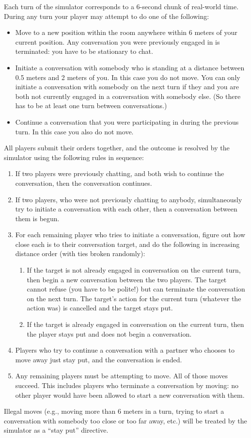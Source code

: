 Each turn of the simulator corresponds to a 6-second chunk of
real-world time. During any turn your player may attempt to do one of the following:
\begin{itemize}
\item Move to a new position within the room anywhere within 6 meters of your current position. Any conversation
you were previously engaged in is terminated: you have to be stationary to chat.
\item Initiate a conversation with somebody who is standing at a distance between 0.5
meters and 2 meters of you. In this case you do not move.
You can only initiate a conversation with somebody on the next turn
if they and you are both not currently engaged in a conversation with
somebody else. (So there has to be at least one turn between conversations.)
\item Continue a conversation that you were participating in during the previous turn. In this case you also do not move.
\end{itemize}

All players submit their orders together, and the outcome is resolved by the simulator using the following rules in sequence:
\begin{enumerate}
\item If two players were previously chatting, and both wish to continue the conversation, then
the conversation continues.
\item If two players, who were not previously chatting to anybody, simultaneously try to initiate a conversation
with each other, then a conversation between them is begun.
\item For each remaining player who tries to initiate a conversation, figure out how close each is to
their conversation target, and do the following in increasing distance order (with ties broken randomly):
\begin{enumerate}
\item If the target is not already engaged in conversation on the current turn, then begin a new conversation
between the two players.  The target cannot refuse (you have to be polite!) but can terminate the conversation on the
next turn.
The target's action for the current turn (whatever the action was) is cancelled and the target stays put.
\item If the target is already engaged in conversation on the current turn, then the player stays put and does
not begin a conversation.
\end{enumerate}
\item Players who try to continue a conversation with a partner who chooses to move away
just stay put, and the conversation is ended.
\item Any remaining players must be attempting to move.  All of those moves succeed.
This includes players who terminate a conversation by moving:
no other player would have been allowed to start a new conversation with them.
\end{enumerate}
Illegal moves (e.g., moving more than 6 meters in a turn, trying to start a conversation with somebody too close or
too far away, etc.) will be treated by the simulator as a ``stay put'' directive.

